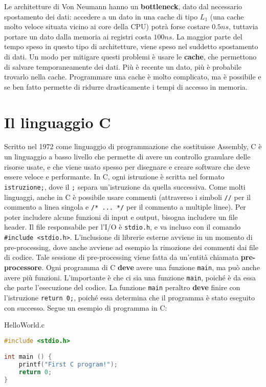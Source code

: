 Le architetture di Von Neumann hanno un \textbf{bottleneck}, dato dal necessario spostamento dei dati: accedere a un dato in una cache di tipo $L_1$ (una cache molto veloce situata vicino ai core della CPU) potrà forse costare $0.5ns$, tuttavia portare un dato dalla memoria ai registri costa $100ns$. La maggior parte del tempo speso in questo tipo di architetture, viene speso nel suddetto spostamento di dati.
\nl
Un modo per mitigare questi problemi è usare le \textbf{cache}, che permettono di salvare temporaneamente dei dati. Più è recente un dato, più è probabile trovarlo nella cache. Programmare una cache è molto complicato, ma è possibile e se ben fatto permette di ridurre drasticamente i tempi di accesso in memoria.

\section{Il linguaggio C}

Scritto nel 1972 come linguaggio di programmazione che sostituisse Assembly, C è un linguaggio a basso livello che permette di avere un controllo granulare delle risorse usate, e che viene usato spesso per disegnare e creare software che deve essere veloce e performante. In C, ogni istruzione è scritta nel formato \verb|istruzione;|, dove il \texttt{;} separa un'istruzione da quella successiva. Come molti linguaggi, anche in C è possibile usare commenti (attraverso i simboli \verb|//| per il commento a linea singola e \verb|/* ... */| per il commento a multiple linee).
\nl
Per poter includere alcune funzioni di input e output, bisogna includere un file header. Il file responsabile per l'I/O è \verb|stdio.h|, e va incluso con il comando \verb|#include <stdio.h>|. L'inclusione di librerie esterne avviene in un momento di pre-processing, dove anche avviene ad esempio la rimozione dei commenti dai file di codice. Tale sessione di pre-processing viene fatta da un'entità chiamata \textbf{pre-processore}.
\nl
Ogni programma di C \textbf{deve} avere una funzione \verb|main|, ma può anche avere più funzioni. L'importante è che ci sia una funzione \verb|main|, poiché è da essa che parte l'esecuzione del codice. La funzione \verb|main| peraltro \textbf{deve} finire con l'istruzione \verb|return 0;|, poiché essa determina che il programma è stato eseguito con successo. Segue un esempio di programma in C:

\begin{codeblock}{HelloWorld.c}
    \begin{lstlisting}[language = c]
#include <stdio.h>

int main () {
    printf("First C program!");
    return 0;
}\end{lstlisting}
\end{codeblock}

